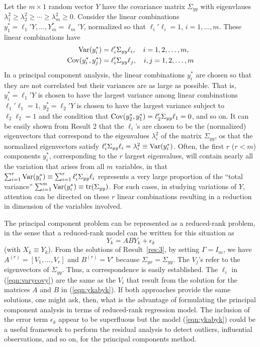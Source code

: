 Let the $m \times 1$ random vector $Y$ have the covariance matrix $\Sigma_{yy}$ with eigenvlaues $\lambda_1^2 \geq \lambda_2^2 \geq \cdots \geq \lambda_m^2 \geq 0$. Consider the linear combinations $y_1^*=\ell_1'Y,\ldots,Y_m^*=\ell_m'Y$, normalized so that $\ell_i' \ell_i=1$, $i=1,\ldots,m$. These linear combinations have 
	\begin{equation}\label{eqn:varycovy}
	\begin{split}
	\Var(y_i^*)&=\ell_i' \Sigma_{yy} \ell_i, \quad i=1,2,\ldots,m, \\
	\Cov(y_i^*,y_j^*)&=\ell_i' \Sigma_{yy}\ell_j, \quad i,j=1,2,\ldots,m
	\end{split}
	\end{equation}
In a principal component analysis, the linear combinations $y_i^*$ are chosen so that they are not correlated but their variances are as large as possible. That is, $y_i^*=\ell_1'Y$ is chosen to have the largest variance among linear combinations $\ell_1'\ell_1=1$, $y_2^*=\ell_2'Y$ is chosen to have the largest variance subject to $\ell_2\ell_2=1$ and the condition that $\operatorname{Cov}(y_2^*,y_1^*)=\ell_2'\Sigma_{yy}\ell_1=0$, and so on. It can be easily shown from Result 2 that the $\ell_i$'s are chosen to be the (normalized) eigenvectors that correspond to the eigenvalues $\lambda_i^2$ of the matrix $\Sigma_{yy}$, os that the normalized eigenvectors satisfy $\ell_i' \Sigma_{yy}\ell_i=\lambda_i^2\equiv \operatorname{Var}(y_i^*)$. Often, the first $r$ ($r<m$) components $y_i^*$, corresponding to the $r$ largest eigenvalues, will contain nearly all the variation that arises from all $m$ variables, in that $\sum_{i=1}^r \operatorname{Var}(y_i^*) \equiv \sum_{i=1}^r \ell_i' \Sigma_{yy} \ell_i$ represents a very large proportion of the ``total variance'' $\sum_{i=1}^m \operatorname{Var}(y_i^*) \equiv \text{tr}(\Sigma_{yy})$. For such cases, in studying variations of $Y$, attention can be directed on these $r$ linear combinations resulting in a reduction in dimension of the variables involved. 


The principal component problem can be represented as a reduced-rank problem, in the sense that a reduced-rank model can be written for this situation as
	\begin{equation}\label{eqn:ykabyk}
	Y_k= ABY_k + \epsilon_k
	\end{equation}
(with $X_k \equiv Y_k$). From the solutions of Result~\ref{res:3}, by setting $\Gamma=I_m$, we have $A^{(r)}=[V_1,\ldots,V_r]$ and $B^{(r)}=V'$ because $\Sigma_{yx}=\Sigma_{yy}$. The $V_j$'s refer to the eigenvectors of $\Sigma_{yy}$. Thus, a correspondence is easily established. The $\ell_i$ in (\ref{eqn:varycovy}) are the same as the $V_i$ that result from the solution for the matrices $A$ and $B$ in (\ref{eqn:ykabyk}). If both approaches provide the same solutions, one might ask, then, what is the advantage of formulating the principal component analysis in terms of reduced-rank regression model. The inclusion of the error term $\epsilon_k$ appear to be superfluous but the model (\ref{eqn:ykabyk}) could be a useful framework to perform the residual analysis to detect outliers, influential observations, and so on, for the principal components method. \\


